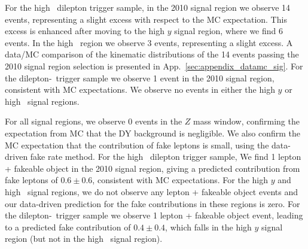 For the high \pt\ dilepton trigger sample, in the 2010 signal region we observe 14 events, representing 
a slight excess with respect to the MC expectation. This excess is enhanced
after moving to the high $y$ signal region, where we find 6 events. 
In the high \Ht\ region we observe 3 events, representing a slight excess.
A data/MC comparison of the kinematic distributions of the 14 events passing
the 2010 signal region selection is presented in App.~\ref{sec:appendix_datamc_sig}.
For the dilepton-\Ht\ trigger sample we observe 1 event in the 2010 signal region,
consistent with MC expectations. We observe no events in either the high $y$ or
high \Ht\ signal regions.

For all signal regions, we observe 0 events in the $Z$ mass window,
confirming the expectation from MC that the 
DY background is negligible. We also confirm the MC expectation that
the contribution of fake leptons is small, using the data-driven fake
rate method. For the high \pt\ dilepton trigger sample, We find 1 lepton + fakeable 
object in the 2010 signal region, giving a predicted contribution from fake 
leptons of $0.6 \pm 0.6$, consistent with MC expectations. For the high $y$ 
and high \Ht\ signal regions, we do not observe any lepton + fakeable object 
events and our data-driven prediction for the fake contributions in these regions is zero.
For the dilepton-\Ht\ trigger sample we observe 1 lepton + fakeable object
event, leading to a predicted fake contribution of $0.4 \pm 0.4$, which falls
in the high $y$ signal region (but not in the high \Ht\ signal region).

